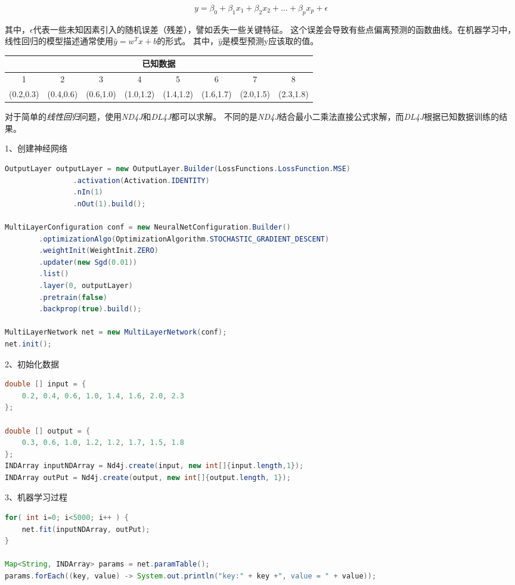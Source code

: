 \begin{equation}
y = \beta_0 + \beta_1x_1+\beta_2x_2+\dots+\beta_px_p+\epsilon
\end{equation}

\noindent
其中，$\epsilon$代表一些未知因素引入的随机误差（残差），譬如丢失一些关键特征。
这个误差会导致有些点偏离预测的函数曲线。在机器学习中，线性回归的模型描述通常使用$\hat{y}=w^Tx+b$的形式。
其中，$\hat{y}$是模型预测y应该取的值。

\begin{table}[!htbp]\centering
\begin{tabular}{|c|c|c|c|c|c|c|c|}
\hline
\multicolumn{8}{|c|}{已知数据}\\
\hline
1&2&3&4&5&6&7&8\\
\hline
(0.2,0.3)&(0.4,0.6)&(0.6,1.0)&(1.0,1.2)&(1.4,1.2)&(1.6,1.7)&(2.0,1.5)&(2.3,1.8)\\
\hline
\end{tabular}
\end{table}

对于简单的\emph{线性回归}问题，使用\emph{ND4J}和\emph{DL4J}都可以求解。
不同的是\emph{ND4J}结合最小二乘法直接公式求解，而\emph{DL4J}根据已知数据训练的结果。
\vspace{0.3cm}

1、创建神经网络
\begin{lstlisting}[language=Java]
OutputLayer outputLayer = new OutputLayer.Builder(LossFunctions.LossFunction.MSE)
                .activation(Activation.IDENTITY)
                .nIn(1)
                .nOut(1).build();

MultiLayerConfiguration conf = new NeuralNetConfiguration.Builder()
        .optimizationAlgo(OptimizationAlgorithm.STOCHASTIC_GRADIENT_DESCENT)
        .weightInit(WeightInit.ZERO)
        .updater(new Sgd(0.01))
        .list()
        .layer(0, outputLayer)
        .pretrain(false)
        .backprop(true).build();

MultiLayerNetwork net = new MultiLayerNetwork(conf);
net.init();
\end{lstlisting}

2、初始化数据
\begin{lstlisting}[language=Java]
double [] input = {
    0.2, 0.4, 0.6, 1.0, 1.4, 1.6, 2.0, 2.3
};

double [] output = {
    0.3, 0.6, 1.0, 1.2, 1.2, 1.7, 1.5, 1.8
};
INDArray inputNDArray = Nd4j.create(input, new int[]{input.length,1});
INDArray outPut = Nd4j.create(output, new int[]{output.length, 1});
\end{lstlisting}
3、机器学习过程
\begin{lstlisting}[language=Java]
for( int i=0; i<5000; i++ ) {
    net.fit(inputNDArray, outPut);
}

Map<String, INDArray> params = net.paramTable();
params.forEach((key, value) -> System.out.println("key:" + key +", value = " + value));
\end{lstlisting}

